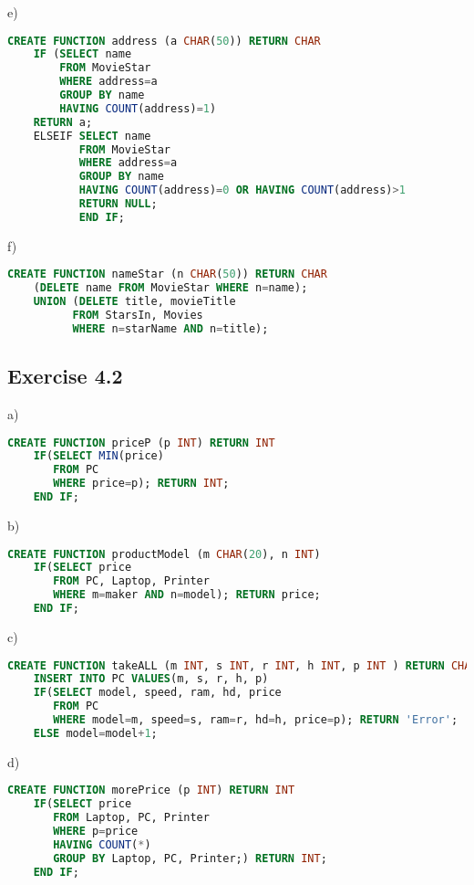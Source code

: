 \documentclass[../../main.tex]{subfiles}
\begin{document}
e)

\begin{lstlisting}[language=sql]
  CREATE FUNCTION address (a CHAR(50)) RETURN CHAR
    IF (SELECT name
        FROM MovieStar
        WHERE address=a
        GROUP BY name
        HAVING COUNT(address)=1)
    RETURN a;
    ELSEIF SELECT name
           FROM MovieStar
           WHERE address=a
           GROUP BY name
           HAVING COUNT(address)=0 OR HAVING COUNT(address)>1
           RETURN NULL;
           END IF;
\end{lstlisting}

f)

\begin{lstlisting}[language=sql]
  CREATE FUNCTION nameStar (n CHAR(50)) RETURN CHAR
    (DELETE name FROM MovieStar WHERE n=name);
    UNION (DELETE title, movieTitle
          FROM StarsIn, Movies
          WHERE n=starName AND n=title);
\end{lstlisting}

\subsection*{Exercise 4.2}

a)

\begin{lstlisting}[language=sql]
  CREATE FUNCTION priceP (p INT) RETURN INT
    IF(SELECT MIN(price)
       FROM PC
       WHERE price=p); RETURN INT;
    END IF;
\end{lstlisting}

b)

\begin{lstlisting}[language=sql]
  CREATE FUNCTION productModel (m CHAR(20), n INT)
    IF(SELECT price
       FROM PC, Laptop, Printer
       WHERE m=maker AND n=model); RETURN price;
    END IF;
\end{lstlisting}

c)

\begin{lstlisting}[language=sql]
  CREATE FUNCTION takeALL (m INT, s INT, r INT, h INT, p INT ) RETURN CHAR
    INSERT INTO PC VALUES(m, s, r, h, p)
    IF(SELECT model, speed, ram, hd, price
       FROM PC
       WHERE model=m, speed=s, ram=r, hd=h, price=p); RETURN 'Error';
    ELSE model=model+1;
\end{lstlisting}

d)

\begin{lstlisting}[language=sql]
  CREATE FUNCTION morePrice (p INT) RETURN INT
    IF(SELECT price
       FROM Laptop, PC, Printer
       WHERE p=price
       HAVING COUNT(*)
       GROUP BY Laptop, PC, Printer;) RETURN INT;
    END IF;
\end{lstlisting}
\end{document}
